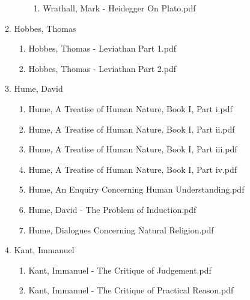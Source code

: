 \documentclass[11pt]{article}
\begin{document}
\begin{enumerate}
\begin{enumerate}
\begin{enumerate}
\begin{enumerate}
\item Wrathall, Mark - Heidegger On Plato.pdf
\label{sec-1-1-1-1-34-25-37-2-5}
\end{enumerate}
\end{enumerate}

\item Hobbes, Thomas
\label{sec-1-1-1-1-34-25-38}
\begin{enumerate}
\item Hobbes, Thomas - Leviathan Part 1.pdf
\label{sec-1-1-1-1-34-25-38-1}

\item Hobbes, Thomas - Leviathan Part 2.pdf
\label{sec-1-1-1-1-34-25-38-2}
\end{enumerate}

\item Hume, David
\label{sec-1-1-1-1-34-25-39}
\begin{enumerate}
\item Hume, A Treatise of Human Nature, Book I, Part i.pdf
\label{sec-1-1-1-1-34-25-39-1}

\item Hume, A Treatise of Human Nature, Book I, Part ii.pdf
\label{sec-1-1-1-1-34-25-39-2}

\item Hume, A Treatise of Human Nature, Book I, Part iii.pdf
\label{sec-1-1-1-1-34-25-39-3}

\item Hume, A Treatise of Human Nature, Book I, Part iv.pdf
\label{sec-1-1-1-1-34-25-39-4}

\item Hume, An Enquiry Concerning Human Understanding.pdf
\label{sec-1-1-1-1-34-25-39-5}

\item Hume, David - The Problem of Induction.pdf
\label{sec-1-1-1-1-34-25-39-6}

\item Hume, Dialogues Concerning Natural Religion.pdf
\label{sec-1-1-1-1-34-25-39-7}
\end{enumerate}

\item Kant, Immanuel
\label{sec-1-1-1-1-34-25-40}
\begin{enumerate}
\item Kant, Immanuel - The Critique of Judgement.pdf
\label{sec-1-1-1-1-34-25-40-1}

\item Kant, Immanuel - The Critique of Practical Reason.pdf
\label{sec-1-1-1-1-34-25-40-2}


\end{enumerate}
\end{enumerate}
\end{enumerate}
\end{document}
